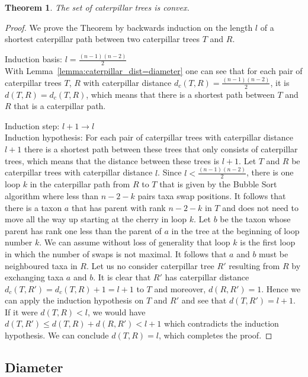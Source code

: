 \documentclass{amsart}
\newtheorem{theorem}[definition]{Theorem}
\begin{document}
\begin{theorem}
    The set of caterpillar trees is convex.
    \label{thm:caterpillar_convex}
\end{theorem}

\begin{proof}
    We prove the Theorem by backwards induction on the length $l$ of a shortest caterpillar path between two caterpillar trees $T$ and $R$.

    Induction basis: $l = \frac{(n-1)(n-2)}{2}$\\
    With Lemma~\ref{lemma:caterpillar_dist=diameter} one can see that for each pair of caterpillar trees $T$, $R$ with caterpillar distance $d_c(T,R) = \frac{(n-1)(n-2)}{2}$, it is $d(T,R) = d_c(T,R)$, which means that there is a shortest path between $T$ and $R$ that is a caterpillar path.

    Induction step: $l+1 \to l$\\
    Induction hypothesis: For each pair of caterpillar trees with caterpillar distance $l+1$ there is a shortest path between these trees that only consists of caterpillar trees, which means that the distance between these trees is $l+1$.
    Let $T$ and $R$ be caterpillar trees with caterpillar distance $l$.
    Since $l < \frac{(n-1)(n-2)}{2}$, there is one loop $k$ in the caterpillar path from $R$ to $T$ that is given by the Bubble Sort algorithm  where less than $n-2-k$ pairs taxa swap positions.
    It follows that there is a taxon $a$ that has parent with rank $n-2-k$ in $T$ and does not need to move all the way up starting at the cherry in loop $k$.
    Let $b$ be the taxon whose parent has rank one less than the parent of $a$ in the tree at the beginning of loop number $k$.
    We can assume without loss of generality that loop $k$ is the first loop in which the number of swaps is not maximal.
    It follows that $a$ and $b$ must be neighboured taxa in $R$.
    Let us no consider caterpillar tree $R'$ resulting from $R$ by exchanging taxa $a$ and $b$.
    It is clear that $R'$ has caterpillar distance $d_c(T,R') = d_c(T,R) + 1 = l+1$ to $T$ and moreover, $d(R,R') = 1$.
    Hence we can apply the induction hypothesis on $T$ and $R'$ and see that $d(T,R') = l+1$.
    If it were $d(T,R) < l$, we would have $d(T,R') \leq d(T,R) + d(R,R') < l + 1$ which contradicts the induction hypothesis.
    We can conclude $d(T,R) = l$, which completes the proof.
\end{proof}


\subsection{Diameter}
\end{document}
